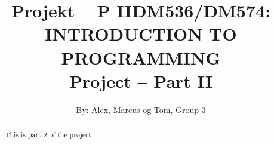 \documentclass[12pt]{article}
\title{Projekt – P II}
\title{DM536/DM574: INTRODUCTION TO PROGRAMMING \\ Project – Part II}
\author{By: Alex, Marcus og Tom, Group 3}
\begin{document}
\maketitle

\begin{abstract}
This is part 2 of the project
\end{abstract}

\section{}
\end{document}
